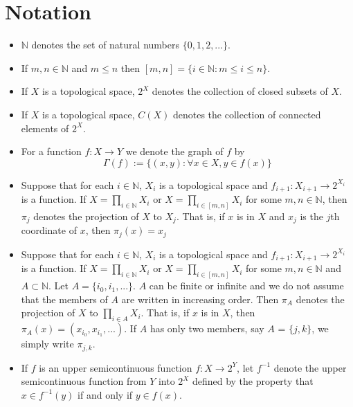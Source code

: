 \documentclass[12pt]{article}
\theoremstyle{definition}
\begin{document}
\section{Notation}
\begin{itemize}

\item $\mathbb{N}$ denotes the set of natural numbers $\lbrace 0, 1, 2, ... \rbrace$.
\item If $m, n \in \mathbb{N}$ and $m \leq n$ then $[m,n] = \lbrace i \in \mathbb{N}:m \leq i \leq n \rbrace$.
\item If $X$ is a topological space, $2^X$ denotes the collection of closed subsets of $X$. 
\item If $X$ is a topological space, $C(X)$ denotes the collection of connected elements of $2^X$.
\item For a function $f: X \to Y$ we denote the graph of $f$ by
\[ \Gamma(f) := \lbrace (x,y) : \forall x \in X, y \in f(x) \rbrace \]

\item Suppose that for each $i \in \mathbb{N}$, $X_i$ is a topological space and $f_{i+1}: X_{i+1} \to 2^{X_i}$ is a function. If $X = \prod _{i \in \mathbb{N}} X_i$ or $X = \prod _{i \in [m,n]} X_i$ for some $m, n \in \mathbb{N}$, then $\pi_j$ denotes the projection of $X$ to $X_j$. That is, if $x$ is in $X$ and $x_j$ is the $j$th coordinate of $x$, then $\pi_j(x) = x_j$

\item Suppose that for each $i \in \mathbb{N}$, $X_i$ is a topological space and $f_{i+1}: X_{i+1} \to 2^{X_i}$ is a function. If $X = \prod _{i \in \mathbb{N}} X_i$ or $X = \prod _{i \in [m,n]} X_i$ for some $m, n \in\mathbb{N}$ and $A \subset \mathbb{N}$. Let $A = \lbrace i_0, i_1, ... \rbrace$. $A$ can be finite or infinite and we do not assume that the members of $A$ are written in increasing order. Then $\pi_A$ denotes the projection of $X$ to  $\prod _{i \in A} X_i$. That is, if $x$ is in $X$, then $\pi_A(x) = (x_{i_{0}}, x_{i_{1}}, ... )$. If $A$ has only two members, say $A$ = $\lbrace j , k \rbrace$, we simply write $\pi_{j, k}$.

\item If $f$ is an upper semicontinuous function $f: X \to 2^Y$, let $f^{-1}$ denote the upper semicontinuous function from $Y$ into $2^X$ defined by the property that $x \in f^{-1}(y)$ if and only if $y \in f(x)$.


\end{itemize}
\newpage
\end{document}
